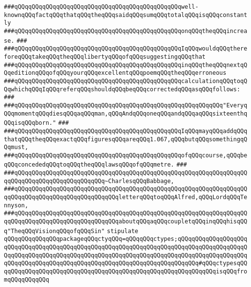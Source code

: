 \verb|###qQQqqQQqqQQqqQQqqQQqqQQqqQQqqQQqqQQqqQQqqQQqqQQqwell-knownqQQqfactqQQqthatqQQqtheqQQqsaidqQQqsumqQQqtotalqQQqisqQQqconstantly|\newline
\verb|###qQQqqQQqqQQqqQQqqQQqqQQqqQQqqQQqqQQqqQQqqQQqqQQqonqQQqtheqQQqincrease.|\newline
\verb|###|\newline
\verb|###qQQqqQQqqQQqqQQqqQQqqQQqqQQqqQQqqQQqqQQqqQQqqQQqIqQQqwouldqQQqthereforeqQQqtakeqQQqtheqQQqlibertyqQQqofqQQqsuggestingqQQqthat|\newline
\verb|###qQQqqQQqqQQqqQQqqQQqqQQqqQQqqQQqqQQqqQQqqQQqqQQqinqQQqtheqQQqnextqQQqeditionqQQqofqQQqyourqQQqexcellentqQQqpoemqQQqtheqQQqerroneous|\newline
\verb|###qQQqqQQqqQQqqQQqqQQqqQQqqQQqqQQqqQQqqQQqqQQqqQQqcalculationqQQqtoqQQqwhichqQQqIqQQqreferqQQqshouldqQQqbeqQQqcorrectedqQQqasqQQqfollows:|\newline
\verb|###|\newline
\verb|###qQQqqQQqqQQqqQQqqQQqqQQqqQQqqQQqqQQqqQQqqQQqqQQqqQQqqQQqqQQq"EveryqQQqmomentqQQqdiesqQQqaqQQqman,qQQqAndqQQqoneqQQqandqQQqaqQQqsixteenthqQQqisqQQqborn."|\newline
\verb|###|\newline
\verb|###qQQqqQQqqQQqqQQqqQQqqQQqqQQqqQQqqQQqqQQqqQQqqQQqIqQQqmayqQQqaddqQQqthatqQQqtheqQQqexactqQQqfiguresqQQqareqQQq1.067,qQQqbutqQQqsomethingqQQqmust,|\newline
\verb|###qQQqqQQqqQQqqQQqqQQqqQQqqQQqqQQqqQQqqQQqqQQqqQQqofqQQqcourse,qQQqbeqQQqconcededqQQqtoqQQqtheqQQqlawsqQQqofqQQqmetre.|\newline
\verb|###|\newline
\verb|###qQQqqQQqqQQqqQQqqQQqqQQqqQQqqQQqqQQqqQQqqQQqqQQqqQQqqQQqqQQqqQQqqQQqqQQqqQQqqQQqqQQqqQQqqQQqqQQq~CharlesqQQqBabbage,|\newline
\verb|###qQQqqQQqqQQqqQQqqQQqqQQqqQQqqQQqqQQqqQQqqQQqqQQqqQQqqQQqqQQqqQQqqQQqqQQqqQQqqQQqqQQqqQQqqQQqqQQqqQQqletterqQQqtoqQQqAlfred,qQQqLordqQQqTennyson,|\newline
\verb|###qQQqqQQqqQQqqQQqqQQqqQQqqQQqqQQqqQQqqQQqqQQqqQQqqQQqqQQqqQQqqQQqqQQqqQQqqQQqqQQqqQQqqQQqqQQqqQQqqQQqaboutqQQqaqQQqcoupletqQQqinqQQqhisqQQq"TheqQQqVisionqQQqofqQQqSin"|\newline
\newline
\newline
\newline
\newline
\verb|stipulate|\newline
\verb|qQQqqQQqqQQqqQQqpackageqQQqctyqQQq=qQQqqQQqctypes;qQQqqQQqqQQqqQQqqQQqqQQqqQQqqQQqqQQqqQQqqQQqqQQqqQQqqQQqqQQqqQQqqQQqqQQqqQQqqQQqqQQqqQQqqQQqqQQqqQQqqQQqqQQqqQQqqQQqqQQqqQQqqQQqqQQqqQQqqQQqqQQqqQQqqQQqqQQqqQQqqQQqqQQqqQQqqQQqqQQqqQQqqQQqqQQqqQQqqQQqqQQqqQQqqQQqqQQq#qQQqctypesqQQqqQQqqQQqqQQqqQQqqQQqqQQqqQQqqQQqqQQqqQQqqQQqqQQqqQQqqQQqqQQqisqQQqfromqQQqqQQqqQQq|\newline
